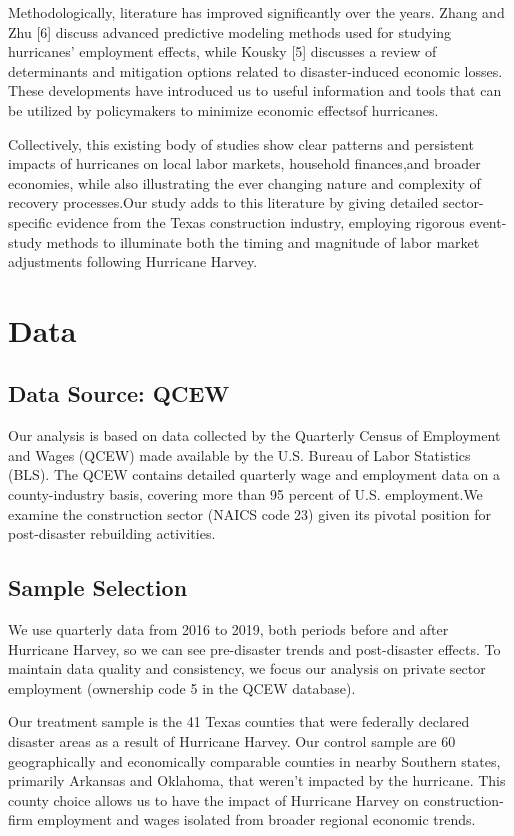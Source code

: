 \documentclass{article}
\begin{document}
Methodologically, literature has improved significantly over the years. Zhang and Zhu [6] discuss advanced predictive modeling methods used for studying hurricanes' employment effects, while Kousky [5] discusses a review of determinants and mitigation options related to disaster-induced economic losses. These developments have introduced us to useful information and tools that can be utilized by policymakers to minimize economic effectsof hurricanes.

Collectively, this existing body of studies show clear patterns and persistent impacts of hurricanes on local labor markets, household finances,and broader economies, while also illustrating the ever changing nature and complexity of recovery processes.Our study adds to this literature by giving detailed sector-specific evidence from the Texas construction industry, employing rigorous event-study methods to illuminate both the timing and magnitude of labor market adjustments following Hurricane Harvey.

\section{Data}

\subsection{Data Source: QCEW}
Our analysis is based on data collected by the Quarterly Census of Employment and Wages (QCEW) made available by the U.S. Bureau of Labor Statistics (BLS). The QCEW contains detailed quarterly wage and employment data on a county-industry basis, covering more than 95 percent of U.S. employment.We examine the construction sector (NAICS code 23) given its pivotal position for post-disaster rebuilding activities.

\subsection{Sample Selection}
We use quarterly data from 2016 to 2019, both periods before and after Hurricane Harvey, so we can see pre-disaster trends and post-disaster effects. To maintain data quality and consistency, we focus our analysis on private sector employment (ownership code 5 in the QCEW database).

Our treatment sample is the 41 Texas counties that were federally declared disaster areas as a result of Hurricane Harvey. Our control sample are 60 geographically and economically comparable counties in nearby Southern states, primarily Arkansas and Oklahoma, that weren't impacted by the hurricane. This county choice allows us to have the impact of Hurricane Harvey on construction-firm employment and wages isolated from broader regional economic trends.
\end{document}
